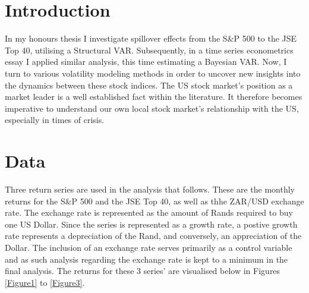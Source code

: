 \documentclass[11pt,preprint, authoryear]{elsarticle}
\numberwithin{equation}{section}
\numberwithin{figure}{section}
\numberwithin{table}{section}
\begin{document}

\headsep 35pt %




\hypertarget{introduction}{%
\section{\texorpdfstring{Introduction
\label{Introduction}}{Introduction }}\label{introduction}}

In my honours thesis I investigate spillover effects from the S\&P 500
to the JSE Top 40, utilising a Structural VAR. Subsequently, in a time
series econometrics essay I applied similar analysis, this time
estimating a Bayesian VAR. Now, I turn to various volatility modeling
methods in order to uncover new insights into the dynamics between these
stock indices. The US stock market's position as a market leader is a
well established fact within the literature. It therefore becomes
imperative to understand our own local stock market's relationship with
the US, especially in times of crisis.

\hypertarget{data}{%
\section{Data}\label{data}}

Three return series are used in the analysis that follows. These are the
monthly returns for the S\&P 500 and the JSE Top 40, as well as thhe
ZAR/USD exchange rate. The exchange rate is represented as the amount of
Rands required to buy one US Dollar. Since the series is represented as
a growth rate, a postive growth rate represents a depreciation of the
Rand, and conversely, an appreciation of the Dollar. The inclusion of an
exchange rate serves primarily as a control variable and as such
analysis regarding the exchange rate is kept to a minimum in the final
analysis. The returns for these 3 series' are visualised below in
Figures \ref{Figure1} to \ref{Figure3}.
\end{document}
